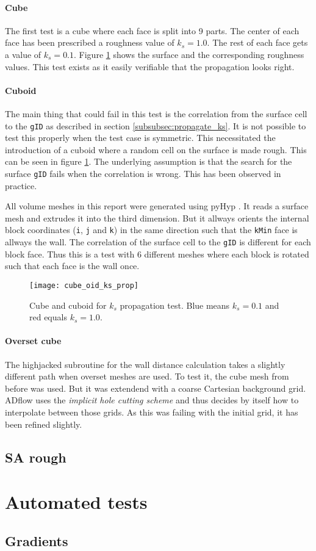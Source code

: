 \paragraph{Cube}
The first test is a cube where each face is split into 9 parts. The center of
each face has been prescribed a roughness value of $k_{s} = 1.0$. The rest of
each face gets a value of $k_{s} = 0.1$. Figure \ref{fig:cube_oid_ks_prop} shows
the surface and the corresponding roughness values. This test exists as it easily
verifiable that the propagation looks right.

\paragraph{Cuboid}
The main thing that could fail in this test is the correlation from the surface
cell to the \texttt{gID} as described in section \ref{subsubsec:propagate_ks}.
It is not possible to test this properly when the test case is symmetric. This
necessitated the introduction of a cuboid where a random cell on the surface is
made rough. This can be seen in figure \ref{fig:cube_oid_ks_prop}. The
underlying assumption is that the search for the surface \texttt{gID} fails when
the correlation is wrong. This has been observed in practice.

All volume meshes in this report were generated using pyHyp \cite{Secco2021}. It
reads a surface mesh and extrudes it into the third dimension. But it allways
orients the internal block coordinates (\texttt{i}, \texttt{j} and \texttt{k})
in the same direction such that the \texttt{kMin} face is allways the wall. The
correlation of the surface cell to the \texttt{gID} is different for each block
face. Thus this is a test with 6 different meshes where each block is rotated
such that each face is the wall once.


\begin{figure}[H] \centering
\texttt{[image: cube\_oid\_ks\_prop]}
    \caption{Cube and cuboid for $k_{s}$ propagation test. Blue means
$k_{s} = 0.1$ and red equals $k_{s} =1.0$.}
    \label{fig:cube_oid_ks_prop}
\end{figure}

\paragraph{Overset cube}
The highjacked subroutine for the wall distance calculation takes a slightly
different path when overset meshes are used. To test it, the cube mesh from
before was used. But it was extendend with a coarse Cartesian  background grid.
ADflow uses the \textit{implicit hole cutting scheme} and thus decides by itself
how to interpolate between those grids. As this was failing with the initial
grid, it has been refined slightly.


\subsection{SA rough}

\section{Automated tests}

\subsection{Gradients}
